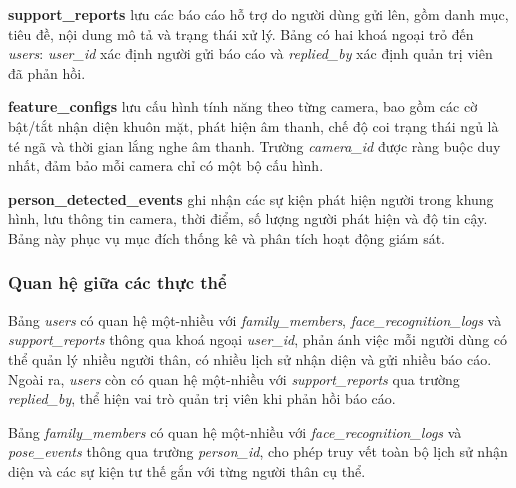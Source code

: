\textbf{support\_reports} lưu các báo cáo hỗ trợ do người dùng gửi lên, gồm danh mục, tiêu đề, nội dung mô tả và trạng thái xử lý. Bảng có hai khoá ngoại trỏ đến \textit{users}: \textit{user\_id} xác định người gửi báo cáo và \textit{replied\_by} xác định quản trị viên đã phản hồi.

\textbf{feature\_configs} lưu cấu hình tính năng theo từng camera, bao gồm các cờ bật/tắt nhận diện khuôn mặt, phát hiện âm thanh, chế độ coi trạng thái ngủ là té ngã và thời gian lắng nghe âm thanh. Trường \textit{camera\_id} được ràng buộc duy nhất, đảm bảo mỗi camera chỉ có một bộ cấu hình.

\textbf{person\_detected\_events} ghi nhận các sự kiện phát hiện người trong khung hình, lưu thông tin camera, thời điểm, số lượng người phát hiện và độ tin cậy. Bảng này phục vụ mục đích thống kê và phân tích hoạt động giám sát.

\subsubsection*{Quan hệ giữa các thực thể}

Bảng \textit{users} có quan hệ một-nhiều với \textit{family\_members}, \textit{face\_recognition\_logs} và \textit{support\_reports} thông qua khoá ngoại \textit{user\_id}, phản ánh việc mỗi người dùng có thể quản lý nhiều người thân, có nhiều lịch sử nhận diện và gửi nhiều báo cáo. Ngoài ra, \textit{users} còn có quan hệ một-nhiều với \textit{support\_reports} qua trường \textit{replied\_by}, thể hiện vai trò quản trị viên khi phản hồi báo cáo.

Bảng \textit{family\_members} có quan hệ một-nhiều với \textit{face\_recognition\_logs} và \textit{pose\_events} thông qua trường \textit{person\_id}, cho phép truy vết toàn bộ lịch sử nhận diện và các sự kiện tư thế gắn với từng người thân cụ thể.